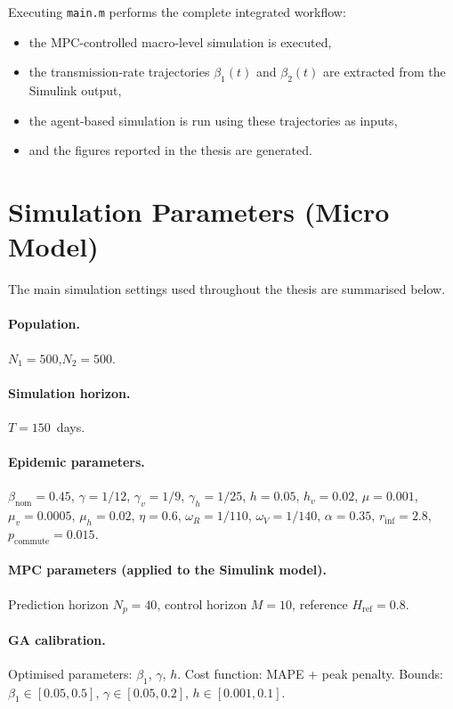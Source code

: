 Executing \texttt{main.m} performs the complete integrated workflow:
\begin{itemize}
  \item the MPC-controlled macro-level simulation is executed,
  \item the transmission-rate trajectories $\beta_1(t)$ and $\beta_2(t)$ are extracted from the Simulink output,
  \item the agent-based simulation is run using these trajectories as inputs,
  \item and the figures reported in the thesis are generated.
\end{itemize}

\section{Simulation Parameters (Micro Model)}
\label{apx:micro_params}

The main simulation settings used throughout the thesis are summarised below.

\paragraph{Population.}
$N_1 = 500$,\quad $N_2 = 500$.

\paragraph{Simulation horizon.}
$T = 150$~days.

\paragraph{Epidemic parameters.}
$\beta_{\mathrm{nom}} = 0.45$, $\gamma = 1/12$, $\gamma_v = 1/9$, $\gamma_h = 1/25$,
$h = 0.05$, $h_v = 0.02$, $\mu = 0.001$, $\mu_v = 0.0005$, $\mu_h = 0.02$,
$\eta = 0.6$, $\omega_R = 1/110$, $\omega_V = 1/140$,
$\alpha = 0.35$, $r_{\mathrm{inf}} = 2.8$, $p_{\mathrm{commute}} = 0.015$.

\paragraph{MPC parameters (applied to the Simulink model).}
Prediction horizon $N_p = 40$, control horizon $M = 10$, reference $H_{\mathrm{ref}} = 0.8$.

\paragraph{GA calibration.}
Optimised parameters: $\beta_1$, $\gamma$, $h$.
Cost function: MAPE + peak penalty.
Bounds: $\beta_1 \in [0.05, 0.5]$, $\gamma \in [0.05, 0.2]$, $h \in [0.001, 0.1]$.

